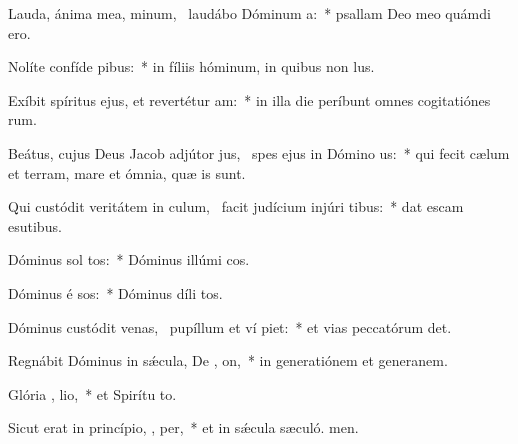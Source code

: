 \item Lauda, ánima mea, minum,~\pscross{} laudábo Dóminum   a:~* psallam Deo meo quámdi ero.
\item Nolíte confíde  pibus:~* in fíliis hóminum, in quibus non  lus.
\item Exíbit spíritus ejus, et revertétur   am:~* in illa die períbunt omnes cogitatiónes rum.
\item Beátus, cujus Deus Jacob adjútor jus,~\pscross{} spes ejus in Dómino  us:~* qui fecit cælum et terram, mare et ómnia, quæ  is sunt.
\item Qui custódit veritátem in culum,~\pscross{} facit judícium injúri tibus:~* dat escam esutibus.
\item Dóminus sol tos:~* Dóminus illúmi cos.
\item Dóminus é sos:~* Dóminus díli tos.
\item Dóminus custódit venas,~\pscross{} pupíllum et ví piet:~* et vias peccatórum det.
\item Regnábit Dóminus in sǽcula, De , on,~* in generatiónem et generanem.
\item Glória ,  lio,~* et Spirítu to.
\item Sicut erat in princípio,  ,  per,~* et in sǽcula sæculó. men.
